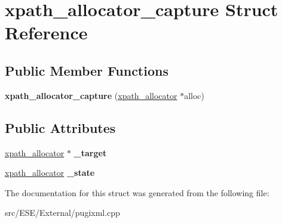 \hypertarget{structxpath__allocator__capture}{\section{xpath\-\_\-allocator\-\_\-capture Struct Reference}
\label{structxpath__allocator__capture}
}
\subsection*{Public Member Functions}
\begin{DoxyCompactItemize}
\item 
\hypertarget{structxpath__allocator__capture_af6925e08c811c0cbda74d4da5b9f2eed}{{\bfseries xpath\-\_\-allocator\-\_\-capture} (\hyperlink{classxpath__allocator}{xpath\-\_\-allocator} $\ast$alloc)}\label{structxpath__allocator__capture_af6925e08c811c0cbda74d4da5b9f2eed}

\end{DoxyCompactItemize}
\subsection*{Public Attributes}
\begin{DoxyCompactItemize}
\item 
\hypertarget{structxpath__allocator__capture_a382acca931c691699ec84a03fb060cf4}{\hyperlink{classxpath__allocator}{xpath\-\_\-allocator} $\ast$ {\bfseries \-\_\-target}}\label{structxpath__allocator__capture_a382acca931c691699ec84a03fb060cf4}

\item 
\hypertarget{structxpath__allocator__capture_a275859dc99681c12b42ee4f51b713d39}{\hyperlink{classxpath__allocator}{xpath\-\_\-allocator} {\bfseries \-\_\-state}}\label{structxpath__allocator__capture_a275859dc99681c12b42ee4f51b713d39}

\end{DoxyCompactItemize}


The documentation for this struct was generated from the following file\-:\begin{DoxyCompactItemize}
\item 
src/\-E\-S\-E/\-External/pugixml.\-cpp\end{DoxyCompactItemize}
